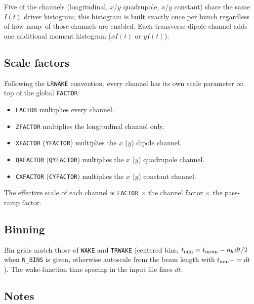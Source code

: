 Five of the channels ({longitudinal, $x$/$y$ quadrupole, $x$/$y$ constant}) share the same $I(t)$ driver histogram; this
histogram is built exactly once per bunch regardless of how many of those channels are enabled.  Each transverse-dipole
channel adds one additional moment histogram ($xI(t)$ or $yI(t)$).

\subsection*{Scale factors}

Following the {\tt LRWAKE} convention, every channel has its own
scale parameter on top of the global {\tt FACTOR}:
\begin{itemize}
\item {\tt FACTOR} multiplies every channel.
\item {\tt ZFACTOR} multiplies the longitudinal channel only.
\item {\tt XFACTOR} ({\tt YFACTOR}) multiplies the $x$ ($y$) dipole channel.
\item {\tt QXFACTOR} ({\tt QYFACTOR}) multiplies the $x$ ($y$) quadrupole channel.
\item {\tt CXFACTOR} ({\tt CYFACTOR}) multiplies the $x$ ($y$) constant channel.
\end{itemize}
The effective scale of each channel is {\tt FACTOR} $\times$ the
channel factor $\times$ the pass-ramp factor.

\subsection*{Binning}

Bin grids match those of {\tt WAKE} and {\tt TRWAKE} (centered bins,
$t_{\rm min} = t_{\rm mean} - n_b\,dt/2$ when {\tt N\_BINS} is given,
otherwise autoscale from the beam length with $t_{\rm min} -= dt$).
The wake-function time spacing in the input file fixes $dt$.

\subsection*{Notes}

